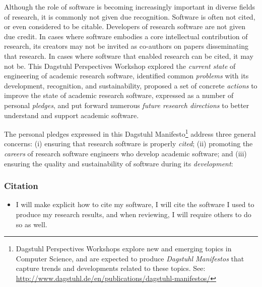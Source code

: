 \documentclass[a4paper,UKenglish]{dagman}
\renewcommand{\paragraph}[1]{\subsubsection*{#1}\xspace}
\begin{document}
Although the role of software is becoming increasingly important in diverse fields of research, it is commonly not given due recognition. Software is often not cited, or even considered to be citable. Developers of research software are not given due credit. In cases where software embodies a core intellectual contribution of research, its creators may not be invited as co-authors on papers disseminating that research. In cases where software that enabled research can be cited, it may not be. 
This Dagstuhl Perspectives Workshop
explored the \emph{current state} of engineering of academic research software,
identified common \emph{problems} with its development, recognition, and sustainability,
proposed a set of concrete \emph{actions} to improve the state of academic research software, expressed as a number of personal \emph{pledges},
and
put forward numerous \emph{future research directions} to better understand and support academic software.

The personal pledges expressed in this Dagstuhl Manifesto\footnote{Dagstuhl Perspectives Workshops explore new and emerging topics in Computer Science, and are expected to produce \emph{Dagstuhl Manifestos} that capture trends and developments related to these topics. See: \url{http://www.dagstuhl.de/en/publications/dagstuhl-manifestos/}} address three general concerns:
(i) ensuring that research software is properly \emph{cited};
(ii) promoting the \emph{careers} of research software engineers who develop academic software;
and
(iii) ensuring the quality and sustainability of software during its \emph{development}:

\paragraph{Citation}
\begin{itemize}
\item I will make explicit how to cite my software, I will cite the software I used to produce my research results, and when reviewing, I will require others to do so as well.
\end{itemize}
\end{document}

